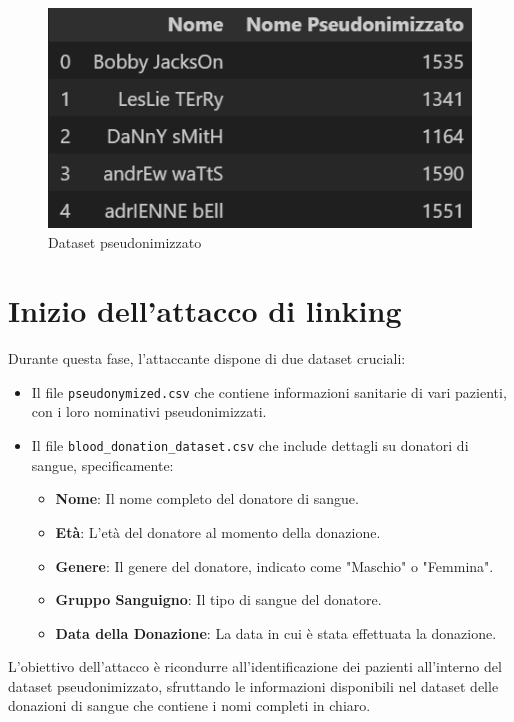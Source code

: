 \begin{figure}[H]
    \centering
    \includegraphics[width=0.95\linewidth]{Images/Img3.png}
    \caption{Dataset pseudonimizzato}
\end{figure}

\section{Inizio dell'attacco di linking}

Durante questa fase, l'attaccante dispone di due dataset cruciali:

\begin{itemize}
    \item Il file \texttt{pseudonymized.csv} che contiene informazioni sanitarie di vari pazienti, con i loro nominativi pseudonimizzati.
    \item Il file \texttt{blood\_donation\_dataset.csv} che include dettagli su donatori di sangue, specificamente:
    
    \begin{itemize}
        \item \textbf{Nome}: Il nome completo del donatore di sangue.
        \item \textbf{Età}: L'età del donatore al momento della donazione.
        \item \textbf{Genere}: Il genere del donatore, indicato come "Maschio" o "Femmina".
        \item \textbf{Gruppo Sanguigno}: Il tipo di sangue del donatore.
        \item \textbf{Data della Donazione}: La data in cui è stata effettuata la donazione.
    \end{itemize}
\end{itemize}

L'obiettivo dell'attacco è ricondurre all'identificazione dei pazienti all'interno del dataset pseudonimizzato, sfruttando le informazioni disponibili nel dataset delle donazioni di sangue che contiene i nomi completi in chiaro. \\

